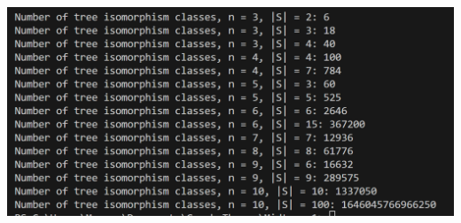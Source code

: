 \documentclass[11pt,reqno]{amsart}
\theoremstyle{definition}
\begin{document}
\includegraphics*{Results.png}

\newpage



\end{document}
